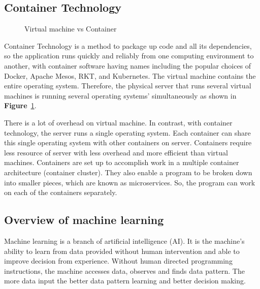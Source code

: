 \documentclass[12pt,oneside,openright,a4paper]{cpe-english-project}
\begin{document}
\subsection{Container Technology}
\begin{figure}[!h]\centering
\setlength{\fboxrule}{0mm} %
\setlength{\fboxsep}{0cm}
\caption{Virtual machine vs Container \cite{docker}}\label{fig:vmVSContainer}
\end{figure}
Container Technology is a method to package up code and all its dependencies, so the application runs quickly and reliably from one computing environment to another, with container software having names including the popular choices of Docker, Apache Mesos, RKT, and Kubernetes.  The virtual machine contains the entire operating system.  Therefore, the physical server that runs several virtual machines is running several operating systems’ simultaneously as shown in \textbf{Figure}~\ref{fig:vmVSContainer}. \cite{docker}

There is a lot of overhead on virtual machine.  In contrast, with container technology, the server runs a single operating system.  Each container can share this single operating system with other containers on server.  Containers require less resource of server with less overhead and more efficient than virtual machines. \cite{container}   Containers are set up to accomplish work in a multiple container architecture (container cluster).  They also enable a program to be broken down into smaller pieces, which are known as microservices.  So, the program can work on each of the containers separately.

\subsection{Overview of machine learning}
Machine learning is a branch of artificial intelligence (AI).  It is the machine’s ability to learn from data provided without human intervention and able to improve decision from experience.  Without human directed programming instructions, the machine accesses data, observes and finds data pattern.  The more data input the better data pattern learning and better decision making.\cite{ml}
\end{document}
